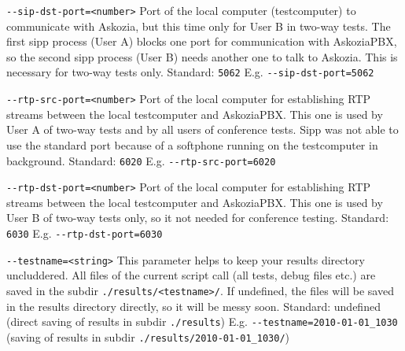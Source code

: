 \begin{description}
\item {\texttt{-{}-sip-dst-port=<number>}} \newline
Port of the local computer (testcomputer) to communicate with Askozia,
but this time only for User B in two-way tests. The first sipp process
(User A) blocks one port for communication with AskoziaPBX,
so the second sipp process (User B) needs another one to talk to Askozia.
This is necessary for two-way tests only.
\newline Standard: \texttt{5062}
\newline E.g. \texttt{-{}-sip-dst-port=5062}

\item {\texttt{-{}-rtp-src-port=<number>}} \newline
Port of the local computer for establishing RTP streams between the local testcomputer
and AskoziaPBX. This one is used by User A of two-way tests and by all users of
conference tests. Sipp was not able to use the standard port because of a
softphone running on the testcomputer in background.
\newline Standard: \texttt{6020}
\newline E.g. \texttt{-{}-rtp-src-port=6020}

\item {\texttt{-{}-rtp-dst-port=<number>}} \newline
Port of the local computer for establishing RTP streams between the local testcomputer
and AskoziaPBX. This one is used by User B of two-way tests only, so it not needed
for conference testing.
\newline Standard: \texttt{6030}
\newline E.g. \texttt{-{}-rtp-dst-port=6030}

\item {\texttt{-{}-testname=<string>}} \newline
This parameter helps to keep your results directory uncluddered. All files of the
current script call (all tests, debug files etc.) are saved in the subdir \newline
\texttt{./results/<testname>/}. If undefined, the files will be saved in the
results directory directly, so it will be messy soon.
\newline Standard: undefined (direct saving of results in subdir \texttt{./results})
\newline E.g. \texttt{-{}-testname=2010-01-01\_1030}
\newline (saving of results in subdir \texttt{./results/2010-01-01\_1030/})


\end{description}
